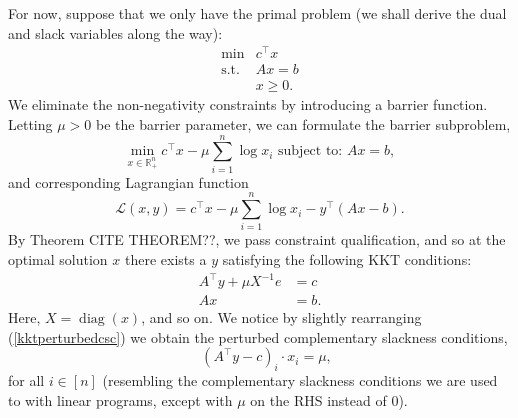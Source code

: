 \documentclass{article}
\numberwithin{equation}{section}
\theoremstyle{definition}
\newcommand{\bR}{\mathbb{R}}
\newcommand{\cL}{\mathcal{L}}
\newcommand{\tst}{\text{s.t.}}
\newcommand{\diag}{\operatorname{diag}}
\begin{document}
For now, suppose that we only have the primal problem (we shall derive the dual and slack variables along the way):
\begin{equation}
    \begin{array}{cc}
         \min & c^\top x  \\
         \tst & Ax=b\\
              & x\ge 0.
    \end{array}
\end{equation}
We eliminate the non-negativity constraints by introducing a barrier function. Letting $\mu>0$ be the barrier parameter, we can formulate the barrier subproblem,
\begin{equation}
    \min_{x\in\bR^n_+} c^\top x-\mu\sum_{i=1}^n\log x_i \text{ subject to: } Ax=b,
\end{equation}
and corresponding Lagrangian function
\begin{equation}
    \cL(x,y)= c^\top x-\mu\sum_{i=1}^n\log x_i-y^\top(Ax-b).
\end{equation}
By Theorem CITE THEOREM??, we pass constraint qualification, and so at the optimal solution $x$ there exists a $y$ satisfying the following KKT conditions:
\begin{align}
    \label{kktperturbedcsc}
    A^\top y+\mu X^{-1}e&=c\\
    Ax&=b.
\end{align}
Here, $X=\diag(x)$, and so on. We notice by slightly rearranging (\ref{kktperturbedcsc}) we obtain the perturbed complementary slackness conditions,
\begin{equation}
    \quad (A^\top y-c)_i\cdot x_i=\mu,
\end{equation}
for all $i\in[n]$ (resembling the complementary slackness conditions we are used to with linear programs, except with $\mu$ on the RHS instead of $0$).
\end{document}
